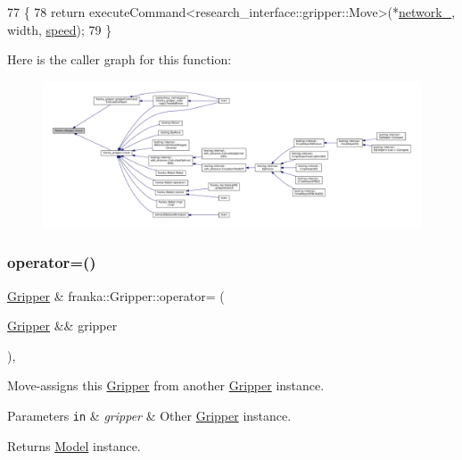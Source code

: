 \begin{DoxyCode}
77                                                    \{
78   \textcolor{keywordflow}{return} executeCommand<research\_interface::gripper::Move>(*\hyperlink{classfranka_1_1Gripper_a0d6702c45e61147da44b08dd757890df}{network\_}, width, 
      \hyperlink{namespacebattery__monitor__node_a78ba7243610b635b1712c5af728edc13}{speed});
79 \}
\end{DoxyCode}
Here is the caller graph for this function\+:
\nopagebreak
\begin{figure}[H]
\begin{center}
\leavevmode
\includegraphics[width=350pt]{classfranka_1_1Gripper_a047bc39267d66d6fb26c4c70669d68c2_icgraph}
\end{center}
\end{figure}
\mbox{\label{classfranka_1_1Gripper_abb64ceecedcb3b2e2bebc262c1589be0}} 
\subsubsection{\texorpdfstring{operator=()}{operator=()}}
{\footnotesize\ttfamily \hyperlink{classfranka_1_1Gripper}{Gripper} \& franka\+::\+Gripper\+::operator= (\begin{DoxyParamCaption}\item[{\hyperlink{classfranka_1_1Gripper}{Gripper} \&\&}]{gripper }\end{DoxyParamCaption})\hspace{0.3cm}{\ttfamily [default]}, {\ttfamily [noexcept]}}

Move-\/assigns this \hyperlink{classfranka_1_1Gripper}{Gripper} from another \hyperlink{classfranka_1_1Gripper}{Gripper} instance.


\begin{DoxyParams}[1]{Parameters}
\mbox{\tt in}  & {\em gripper} & Other \hyperlink{classfranka_1_1Gripper}{Gripper} instance.\\
\hline
\end{DoxyParams}
\begin{DoxyReturn}{Returns}
\hyperlink{classfranka_1_1Model}{Model} instance. 
\end{DoxyReturn}


